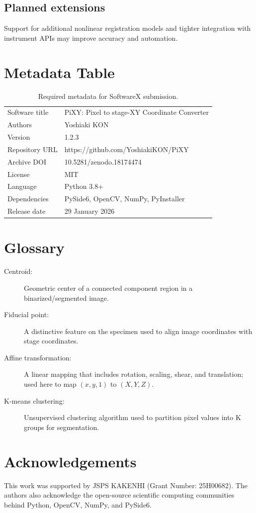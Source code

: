 \documentclass[preprint,12pt]{elsarticle}
\begin{document}
\subsection{Planned extensions}
Support for additional nonlinear registration models and tighter integration with instrument APIs may improve accuracy and automation.

\section{Metadata Table}
\begin{table}[ht]
\centering
\begin{tabular}{ll}
\toprule
Software title & PiXY: Pixel to stage-XY Coordinate Converter \\
Authors & Yoshiaki KON \\
Version & 1.2.3 \\
Repository URL & https://github.com/YoshiakiKON/PiXY \\
Archive DOI & 10.5281/zenodo.18174474 \\
License & MIT \\
Language & Python 3.8+ \\
Dependencies & PySide6, OpenCV, NumPy, PyInstaller \\
Release date & 29 January 2026 \\
\bottomrule
\end{tabular}
\caption{Required metadata for SoftwareX submission.}
\end{table}

\section{Glossary}
\begin{description}
  \item[Centroid:] Geometric center of a connected component region in a binarized/segmented image.
  \item[Fiducial point:] A distinctive feature on the specimen used to align image coordinates with stage coordinates.
  \item[Affine transformation:] A linear mapping that includes rotation, scaling, shear, and translation; used here to map $(x,y,1)$ to $(X,Y,Z)$.
  \item[K-means clustering:] Unsupervised clustering algorithm used to partition pixel values into K groups for segmentation.
\end{description}

\section{Acknowledgements}
This work was supported by JSPS KAKENHI (Grant Number: 25H00682). The authors also acknowledge the open-source scientific computing communities behind Python, OpenCV, NumPy, and PySide6.
\end{document}
